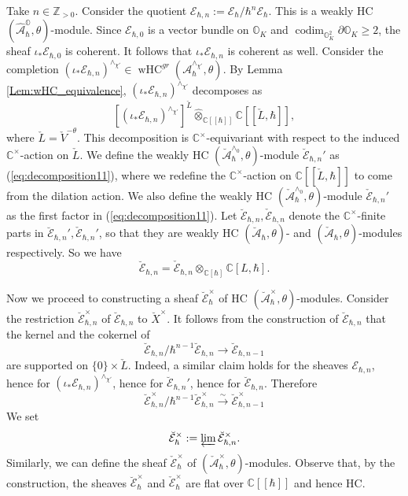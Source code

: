 \documentclass[12pt]{amsart}
\newcommand{\C}{\mathbb{C}}
\newcommand{\A}{\mathcal{A}}
\newcommand{\Orb}{\mathbb{O}}
\newcommand{\Z}{\mathbb{Z}}
\newcommand{\wHC}{\operatorname{wHC}}
\newcommand{\Ecal}{\mathcal{E}}
\theoremstyle{definition}
\numberwithin{equation}{section}
\begin{document}
 Take $n\in \Z_{>0}$.
Consider the quotient $\mathcal{E}_{\hbar,n}:=\mathcal{E}_\hbar/\hbar^n\mathcal{E}_\hbar$. This is
a weakly HC $(\hat{\A}_\hbar^\Orb,\theta)$-module. Since $\mathcal{E}_{\hbar,0}$ is a vector
bundle on $\Orb_K$ and $\operatorname{codim}_{\Orb_K^2}\partial \Orb_K\geqslant 2$,
the sheaf $\iota_* \mathcal{E}_{\hbar,0}$ is coherent. It follows that
$\iota_*\mathcal{E}_{\hbar,n}$ is coherent as well. Consider the completion
$(\iota_*\mathcal{E}_{\hbar,n})^{\wedge_{\chi'}} \in \wHC^{gr}(\A_\hbar^{\wedge_{\chi'}},\theta)$.
By Lemma  \ref{Lem:wHC_equivalence}, $(\iota_*\mathcal{E}_{\hbar,n})^{\wedge_{\chi'}}$
decomposes as
\begin{equation}\label{eq:decomposition11}[(\iota_*\mathcal{E}_{\hbar,n})^{\wedge_{\chi'}}]^{\check{L}}\widehat{\otimes}_{\C[[\hbar]]}
\C[[\check{L},\hbar]],
\end{equation}
where $\check{L}=\check{V}^{-\theta}$. This decomposition is $\C^\times$-equivariant
with respect to the induced $\C^\times$-action on $\check{L}$. We define
the weakly HC $(\breve{\A}_\hbar^{\wedge_0}, \theta)$-module $\breve{\Ecal}_{\hbar,n}'$ as (\ref{eq:decomposition11}), where we redefine
the $\C^\times$-action on $\C[[\check{L},\hbar]]$ to come from the dilation action.
We also define the weakly HC $(\check{\A}_\hbar^{\wedge_0}, \theta)$-module $\check{\Ecal}_{\hbar,n}'$ as the first factor in (\ref{eq:decomposition11}).
Let $\breve{\Ecal}_{\hbar,n},\check{\Ecal}_{\hbar,n}$ denote the $\C^\times$-finite parts
in $\breve{\Ecal}_{\hbar,n}', \check{\Ecal}_{\hbar,n}'$, so that they are weakly HC $(\breve{\A}_\hbar, \theta)$- and $(\check{\A}_\hbar, \theta)$-modules respectively. So we have
\begin{equation}\label{eq:decomposition115}
\breve{\Ecal}_{\hbar,n}=\check{\Ecal}_{\hbar,n}\otimes_{\C[\hbar]}\C[L,\hbar].
\end{equation}

Now we proceed to constructing a sheaf $\breve{\Ecal}^\times_\hbar$ of HC $(\breve{\A}_\hbar^\times, \theta)$-modules. Consider the restriction
$\breve{\Ecal}_{\hbar,n}^\times$ of $\breve{\Ecal}_{\hbar,n}$ to $\breve{X}^\times$.
It follows from the construction of $\breve{\Ecal}_{\hbar,n}$
that the kernel and the cokernel of
$$\breve{\Ecal}_{\hbar,n}/\hbar^{n-1}\breve{\Ecal}_{\hbar,n}
\rightarrow \breve{\Ecal}_{\hbar,n-1}$$
are supported on $\{0\}\times \check{L}$. Indeed, a similar claim holds for
the sheaves $\Ecal_{\hbar,n}$, hence for $(\iota_*\mathcal{E}_{\hbar,n})^{\wedge_{\chi'}}$,
hence for $\breve{\Ecal}_{\hbar,n}'$, hence for $\breve{\Ecal}_{\hbar,n}$.
Therefore
\begin{equation}\label{eq:sheaf_map}\breve{\Ecal}^\times_{\hbar,n}/\hbar^{n-1}\breve{\Ecal}^\times_{\hbar,n}
\xrightarrow{\sim} \breve{\Ecal}^\times_{\hbar,n-1}\end{equation}
We set
$$\breve{\Ecal}_\hbar^\times:=\varprojlim \breve{\Ecal}^\times_{\hbar,n}.$$
Similarly, we can define the sheaf $\check{\Ecal}^\times_\hbar$ of $(\check{\A}_\hbar^\times, \theta)$-modules. Observe that, by the construction, the sheaves $\breve{\Ecal}^\times_\hbar$
and $\check{\Ecal}^\times_\hbar$ are flat over $\C[[\hbar]]$ and hence HC.
\end{document}
